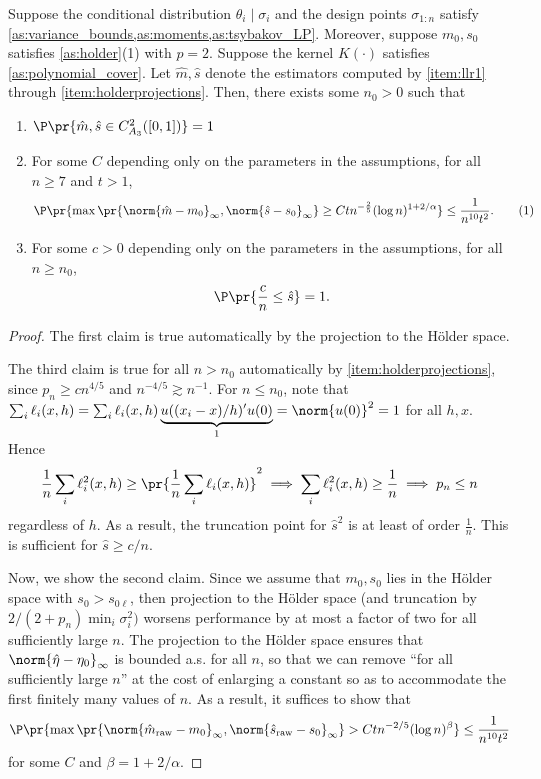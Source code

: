 \documentclass[12pt, reqno]{amsart}
\newcommand\numberthis{\addtocounter{equation}{1}\tag{\theequation}}
\newcommand{\raw}{\mathrm{raw}}
\newcommand{\hatm}{\hat m}
\newcommand{\hats}{\hat s}
\newcommand{\hateta}{\hat\eta}
\numberwithin{equation}{section}
\begin{document}
\begin{refsection}
\begin{appendices}
\begin{theorem}
\label{thm:kernel_rates}
  Suppose the conditional distribution $\theta_i \mid \sigma_i$ and the design points
  $\sigma_{1:n}$ satisfy   \cref{as:variance_bounds,as:moments,as:tsybakov_LP}. Moreover,
  suppose $m_0, s_0$ satisfies \cref{as:holder}(1) with $p=2$. Suppose the kernel
  $K(\cdot)$ satisfies \cref{as:polynomial_cover}. Let $\hatm, \hats$ denote the
  estimators computed by \cref{item:llr1} through \cref{item:holderprojections}. Then,
  there exists some $n_0 > 0$ such that 
   \begin{enumerate}
   \item $\P\pr{\hatm, \hats \in C_{A_3}^2([0,1])} = 1$
     \item For some $C$ depending only on the parameters in the assumptions, for all $n
     \ge 7$ and $t > 1$, \[
\P\pr{
  \max\pr{\norm{\hatm - m_0}_\infty, \norm{\hats- s_0}_\infty} \ge C t n^{-\frac{2}{5}} 
  (\log n)^
  {1+2/\alpha}
} \le \frac{1}{n^{10} t^2}. \numberthis \label{eq:largedeviationkernel}
     \]
     \item For some $c > 0$ depending only on the parameters in the assumptions, for all
     $n
     \ge n_0$, \[
\P\pr{\frac{c}{n} \le \hats} = 1.
     \]
   \end{enumerate}
\end{theorem}


\begin{proof}
The first claim is true automatically by the projection to the H\"older space. 

The third
claim is true for all $n > n_0$ automatically by \cref{item:holderprojections}, since $p_n
\ge c n^ {4/5}$
and $n^{-4/5} \gtrsim n^
{-1}$. For $n \le n_0$, note that $\sum_i \ell_i(x, h) = \sum_i \ell_i(x,h) \underbrace{u(
(x_i-x)/h)'u
(0) }_{1} = \norm{u(0)}^2 = 1$
for all $h, x$. Hence \[
\frac{1}{n}\sum_i \ell_i^2(x, h) \ge \pr{\frac{1}{n}\sum_i \ell_i(x,h)}^2 \implies \sum_i
\ell_i^2(x, h) \ge \frac{1}{n} \implies p_n \le n
\]
regardless of $h$. As a result, the truncation point for $\hat s^2$ is at least of order
$\frac{1}{n}$. This is sufficient for $\hat s \ge c/n$. 

Now, we show the second claim. Since we assume that $m_0, s_0$ lies in the H\"older space
with $s_0 > s_{0\ell}$, then
projection to the H\"older space (and truncation by $2/(2+p_n) \min_i \sigma_i^2)$ worsens
performance by at most a factor of two for all sufficiently large $n$. The projection to
the H\"older space ensures that $\norm{\hateta - \eta_0}_\infty$ is bounded a.s. for all
$n$, so that
we can remove ``for all sufficiently large $n$'' at the cost of enlarging a constant so
as to accommodate the first finitely many values of $n$.
As a result, it suffices to show that \[
\P\pr{
  \max\pr{\norm{\hatm_\raw - m_0}_\infty, \norm{\hats_\raw - s_0}_\infty} > Ct n^{-2/5}
  (\log n)^\beta
} \le \frac{1}{n^{10} t^2}
\]
for some $C$ and $\beta = 1+2/\alpha$.


\end{proof}
\end{appendices}
\end{refsection}
\end{document}
